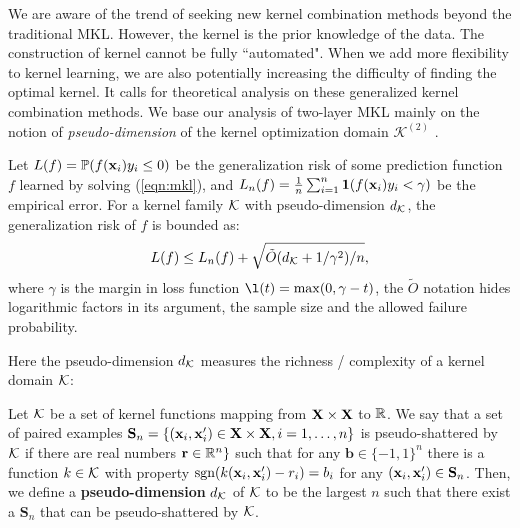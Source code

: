 We are aware of the trend of seeking new kernel combination methods beyond
the traditional MKL. However, the kernel is the prior knowledge of the data. The construction of kernel cannot be fully ``automated". When we add more flexibility to kernel learning, we are also potentially increasing the difficulty of finding the optimal kernel. It calls for theoretical analysis on these generalized kernel combination methods. We base our analysis of two-layer MKL mainly on the notion of {\em pseudo-dimension} of the kernel optimization domain $\mathcal K^{(2)}$ \cite{colt/SrebroB06}.%
\begin{theorem}\cite{colt/SrebroB06}
Let $L(f) = {\mathbb P}(f({\bf x}_i)y_i \leq 0)$ be the generalization risk of some prediction
function $f$ learned by solving (\ref{eqn:mkl}), and $L_n(f) = \frac{1}{n}
\sum_{i=1}^n {\bf 1}(f({\bf x}_i)y_i < \gamma)$ be the empirical error. For a kernel family
${\mathcal K}$ with pseudo-dimension $d_{\mathcal K}$, the generalization risk of $f$ is bounded as:
\[
L(f) \leq L_n(f) + \sqrt{\tilde{O}(d_{\mathcal K} + 1 / \gamma^2) / n},
\]
where $\gamma$ is the margin in loss function $\l(t) = \max(0, \gamma - t)$, the
$\tilde{O}$ notation hides logarithmic factors in its argument, the sample size and the
allowed failure probability.
\end{theorem}
Here the pseudo-dimension $d_{\mathcal K}$ measures the richness / complexity of a kernel domain ${\mathcal K}$:
\begin{definition}\label{def:pseudo-dim}
Let ${\mathcal K}$ be a set of kernel functions mapping from ${\mathbf X}\times{\mathbf X}$ to ${\mathbb R}$. We say that
a set of paired examples $\mathbf S_n = \{({\bf x}_i, {\bf x}_i') \in {\mathbf X}\times{\mathbf X}, i = 1, \ldots, n
\}$ is pseudo-shattered by ${\mathcal K}$ if there are real numbers $\mathbf r \in {\mathbb R}^n \}$ such
that for any $\mathbf b \in \{-1, 1\}^n$ there is a function $k \in {\mathcal K}$ with property
$\mbox{sgn}(k({\bf x}_i, {\bf x}_i') - r_i) = b_i$ for any $({\bf x}_i, {\bf x}_i') \in \mathbf S_n$. Then,
we define a {\bf pseudo-dimension} $d_{{\mathcal K}}$ of ${\mathcal K}$ to be the largest $n$ such that
there exist a $\mathbf S_n$ that can be pseudo-shattered by ${\mathcal K}$.
\end{definition}

